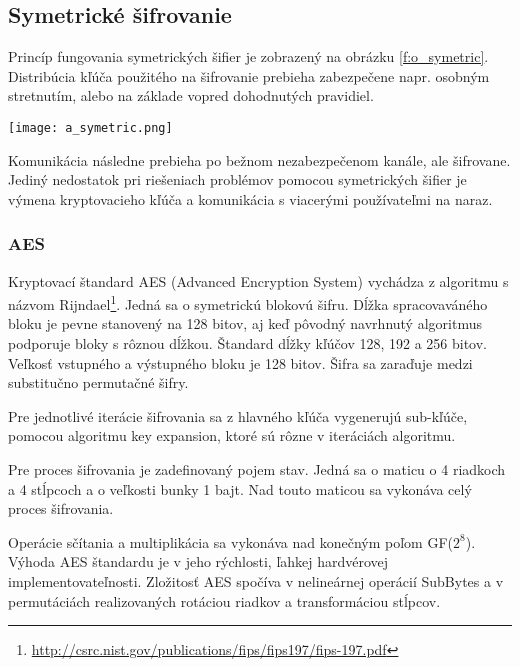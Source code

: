 \documentclass[12pt,a4paper,oneside,openright]{report}
\begin{document}

\subsection{Symetrické šifrovanie} \label{s_cpyt_symetric}
Princíp fungovania symetrických šifier je zobrazený na obrázku \ref{f:o_symetric}. Distribúcia kľúča použitého na šifrovanie prebieha zabezpečene napr. osobným stretnutím, alebo na základe vopred dohodnutých pravidiel.

\begin{figure*}[!hbt]
	\centering
	\texttt{[image: a\_symetric.png]}
	\caption{Princíp fungovania symetrických šifier. \cite{cryptographyhandbook}}
	\label{f:o_symetric}
\end{figure*}

Komunikácia následne prebieha po bežnom nezabezpečenom kanále, ale šifrovane. Jediný nedostatok pri riešeniach problémov pomocou symetrických šifier je výmena kryptovacieho kľúča a komunikácia s viacerými používateľmi na naraz.

\subsubsection{AES} %
Kryptovací štandard AES (Advanced Encryption System) vychádza z algoritmu s názvom Rijndael\footnote{\url{http://csrc.nist.gov/publications/fips/fips197/fips-197.pdf}}. Jedná sa o symetrickú blokovú šifru. Dĺžka spracovaváného bloku je pevne stanovený na 128 bitov, aj keď pôvodný navrhnutý algoritmus podporuje bloky s rôznou dĺžkou. Štandard dĺžky kľúčov 128, 192 a 256 bitov. Veľkosť vstupného a výstupného bloku je 128 bitov. Šifra sa zaraďuje medzi substitučno permutačné šifry.

Pre jednotlivé iterácie šifrovania sa z hlavného kľúča vygenerujú sub-kľúče, pomocou algoritmu key expansion, ktoré sú rôzne v iteráciách algoritmu.

Pre proces šifrovania je zadefinovaný pojem stav. Jedná sa o maticu o 4 riadkoch a 4 stĺpcoch a o veľkosti bunky 1 bajt. Nad touto maticou sa vykonáva celý proces šifrovania.

Operácie sčítania a multiplikácia sa vykonáva nad konečným poľom GF($2^8$).
Výhoda AES štandardu je v jeho rýchlosti, ľahkej hardvérovej  implementovateľnosti. Zložitosť AES spočíva v nelineárnej operácií SubBytes a v permutáciách realizovaných rotáciou riadkov a transformáciou stĺpcov.
\end{document}

